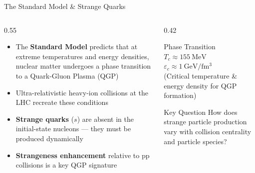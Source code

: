 \documentclass[10pt, aspectratio=169]{beamer}
\begin{document}
\begin{frame}{The Standard Model \& Strange Quarks}

  \begin{columns}
    \begin{column}{0.55\textwidth}
      \begin{itemize}
        \item The \textbf{Standard Model} predicts that at extreme temperatures and energy densities, nuclear matter undergoes a phase transition to a \alert{Quark-Gluon Plasma (QGP)}
        \item Ultra-relativistic heavy-ion collisions at the LHC recreate these conditions
        \item \textbf{Strange quarks} ($s$) are absent in the initial-state nucleons — they must be \alert{produced dynamically}
        \item \textbf{Strangeness enhancement} relative to pp collisions is a key QGP signature
      \end{itemize}
    \end{column}
    \begin{column}{0.42\textwidth}
      \begin{block}{Phase Transition}
        \centering
        \vspace{0.3cm}
        $T_c \approx 155 \ \mathrm{MeV}$ \\[5pt]
        $\varepsilon_c \approx 1 \ \mathrm{GeV/fm^3}$ \\[5pt]
        \small (Critical temperature \& energy density for QGP formation)
        \vspace{0.3cm}
      \end{block}
      \vspace{0.3cm}
      \begin{alertblock}{Key Question}
        \small How does strange particle production vary with collision centrality and particle species?
      \end{alertblock}
    \end{column}
  \end{columns}

\end{frame}
\end{document}
